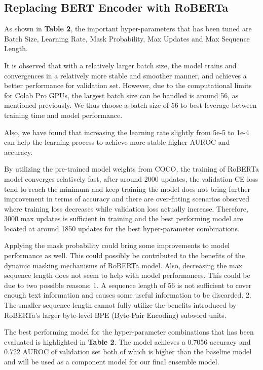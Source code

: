 \documentclass[10pt,twocolumn,letterpaper]{article}
\begin{document}
\subsection{Replacing BERT Encoder with RoBERTa}
As shown in \textbf{Table 2}, the important hyper-parameters that has been tuned are Batch Size, Learning Rate, Mask Probability, Max Updates and Max Sequence Length. 

It is observed that with a relatively larger batch size, the model trains and convergences in a relatively more stable and smoother manner, and achieves a better performance for validation set. However, due to the computational limits for Colab Pro GPUs, the largest batch size can be handled is around 56, as mentioned previously. We thus choose a batch size of 56 to best leverage between training time and model performance. 

Also, we have found that increasing the learning rate slightly from 5e-5 to 1e-4 can help the learning process to achieve more stable higher AUROC and accuracy. 

By utilizing the pre-trained model weights from COCO, the training of RoBERTa model converges relatively fast, after around 2000 updates, the validation CE loss tend to reach the minimum and keep training the model does not bring further improvement in terms of accuracy and there are over-fitting scenarios observed where training loss decreases while validation loss actually increase. Therefore, 3000 max updates is sufficient in training and the best performing model are located at around 1850 updates for the best hyper-parameter combinations. 

Applying the mask probability could bring some improvements to model performance as well. This could possibly be contributed to the benefits of the dynamic masking mechanisms of RoBERTa model. Also, decreasing the max sequence length does not seem to help with model performances. This could be due to two possible reasons: 1. A sequence length of 56 is not sufficient to cover enough text information and causes some useful information to be discarded. 2. The smaller sequence length cannot fully utilize the benefits introduced by RoBERTa's larger byte-level BPE (Byte-Pair Encoding) subword units.

The best performing model for the hyper-parameter combinations that has been evaluated is highlighted in \textbf{Table 2}. The model achieves a 0.7056 accuracy and 0.722 AUROC of validation set both of which is higher than the baseline model and will be used as a component model for our final ensemble model.
\end{document}

